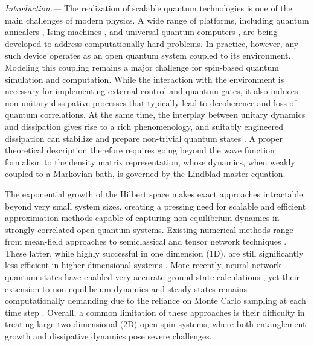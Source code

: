 \documentclass[aps,prl,twocolumn,superscriptaddress,english,floatfix]{revtex4-2}
\begin{document}
{\it Introduction.---}
The realization of scalable quantum technologies is one of the main challenges of modern physics. A wide range of platforms, including quantum annealers \cite{Kadowaki1998, Farhi2001, Johnson2011}, Ising machines \cite{Kim2010, Wang2013, Goto2019, tosca2025-EmergentEquilibrium}, and universal quantum computers \cite{Preskill2018, Bluvstein2023, Berritta2024}, are being developed to address computationally hard problems. In practice, however, any such device operates as an open quantum system coupled to its environment. Modeling this coupling remains a major challenge for spin-based quantum simulation and computation. While the interaction with the environment is necessary for implementing external control and quantum gates, it also induces non-unitary dissipative processes that typically lead to decoherence and loss of quantum correlations. At the same time, the interplay between unitary dynamics and dissipation gives rise to a rich phenomenology, and suitably engineered dissipation can stabilize and prepare non-trivial quantum states \cite{Lidar1998, Beige2000, Kempe2001, Leghtas2013, Budich2015, Roghani2018,liDissipationinducedAntiferromagneticlikeFrustration2021,Wang2023}. A proper theoretical description therefore requires going beyond the wave function formalism to the density matrix representation, whose dynamics, when weakly coupled to a Markovian bath, is governed by the Lindblad master equation.

The exponential growth of the Hilbert space makes exact approaches intractable beyond very small system sizes, creating a pressing need for scalable and efficient approximation methods capable of capturing non-equilibrium dynamics in strongly correlated open quantum systems. Existing numerical methods range from mean-field approaches \cite{Jin2016, Biella2018} to semiclassical \cite{Schachenmayer2015, Huber2021, verstraelenQuantumClassicalCorrelations2023, liMonitoredLongrangeInteracting2025} and tensor network techniques \cite{Vidal2004, verstraete2004renormalizationalgorithmsquantummanybody, Hryniuk2024}. These latter, while highly successful in one dimension (1D), are still significantly less efficient in higher dimensional systems \cite{Kilda2021}. More recently, neural network quantum states have enabled very accurate ground state calculations \cite{Carleo2017, Pfau2024}, yet their extension to non-equilibrium dynamics and steady states remains computationally demanding due to the reliance on Monte Carlo sampling at each time step \cite{hartmannNeuralNetworkApproachDissipative2019,Vicentini2019, Luo2022}. Overall, a common limitation of these approaches is their difficulty in treating large two-dimensional (2D) open spin systems, where both entanglement growth and dissipative dynamics pose severe challenges.
\end{document}
